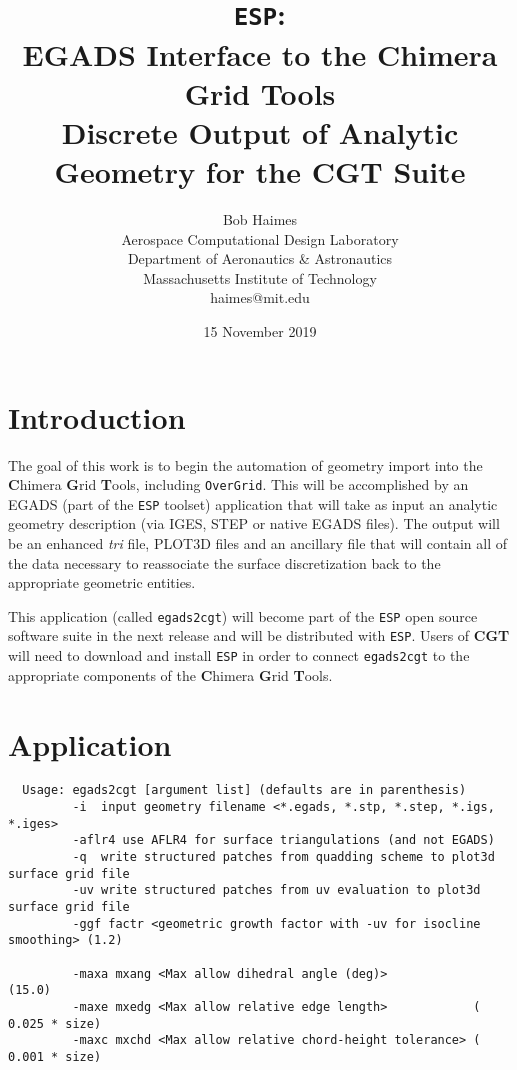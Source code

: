 \documentclass[titlepage]{article}
\title{\vspace{-1.0in}
       {\LARGE {\tt ESP}: \\ {\bf EGADS Interface to the {\bf C}himera {\bf G}rid {\bf T}ools}}\\
       \vspace{0.20in}
       Discrete Output of Analytic Geometry for the {\bf CGT} Suite}
\author{Bob Haimes\\
  Aerospace Computational Design Laboratory \\
  Department of Aeronautics \& Astronautics\\
  Massachusetts Institute of Technology\\
  haimes@mit.edu}
\date{15 November 2019}
\begin{document}
\let\originalnewpage\newpage
\let\newpage\relax
\maketitle
\let\newpage\originalnewpage

\vspace{0.5in}
\section{Introduction}

The goal of this work is to begin the automation of geometry import into the
{\bf C}himera {\bf G}rid {\bf T}ools, including {\tt OverGrid}. This will be accomplished by
an EGADS (part of the {\tt ESP} toolset) application that will take as input
an analytic geometry description (via IGES, STEP or native EGADS files).
The output will be an enhanced {\it tri} file, PLOT3D files and an ancillary
file that will contain all of the data necessary to reassociate the surface discretization
back to the appropriate geometric entities.

\vspace{0.075in}
This application (called {\tt egads2cgt}) will become part of the {\tt ESP} open source software suite
in the next release and will be distributed with {\tt ESP}. Users of {\bf CGT} will need to download and install {\tt ESP}
in order to connect {\tt egads2cgt} to the appropriate components of the {\bf C}himera {\bf G}rid {\bf T}ools.

\newpage
\section{Application}

\begin{verbatim}
  Usage: egads2cgt [argument list] (defaults are in parenthesis)
         -i  input geometry filename <*.egads, *.stp, *.step, *.igs, *.iges>
         -aflr4 use AFLR4 for surface triangulations (and not EGADS)
         -q  write structured patches from quadding scheme to plot3d surface grid file
         -uv write structured patches from uv evaluation to plot3d surface grid file
         -ggf factr <geometric growth factor with -uv for isocline smoothing> (1.2)
            
         -maxa mxang <Max allow dihedral angle (deg)>            (15.0)
         -maxe mxedg <Max allow relative edge length>            ( 0.025 * size)
         -maxc mxchd <Max allow relative chord-height tolerance> ( 0.001 * size)
\end{verbatim}
\end{document}
